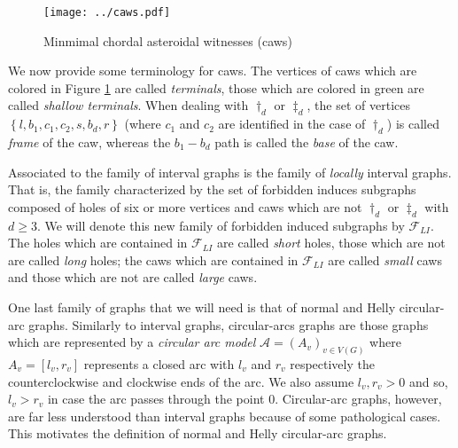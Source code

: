 \documentclass{article}
\theoremstyle{definition}
\begin{document}
    \begin{figure}[h]
        \centering
        \texttt{[image: ../caws.pdf]}
        \caption{Minmimal chordal asteroidal witnesses (caws)}
        \label{caws}
    \end{figure}


    We now provide some
    terminology for caws.
    The vertices of caws
    which are colored in
    Figure \ref{caws} are called
    \emph{terminals},
    those which are
    colored in green
    are called
    \emph{shallow terminals}.
    When dealing
    with $\dagger_{d}$ or
    $\ddagger_{d}$,
    the set of vertices
    $\left\{l, b_1, c_1, c_2, s, b_d, r\right\}$
    (where $c_1$ and $c_2$ are
    identified in the case of $\dagger_{d}$)
    is called \emph{frame} of the caw,
    whereas the $b_1 - b_{d}$
    path is called the \emph{base}
    of the caw.

    Associated to the family 
    of interval graphs is the
    family of \emph{locally} interval
    graphs. That is, the family
    characterized by the set of forbidden
    induces subgraphs
    composed of holes
    of six or more vertices
    and caws which are
    not $\dagger_{d}$ or
    $\ddagger_{d}$ with
    $d \geq 3$.
    We will denote
    this new family of
    forbidden induced
    subgraphs by
    $\mathcal{F}_{LI}$.
    The holes which
    are contained
    in $\mathcal{F}_{LI}$ 
    are called \emph{short}
    holes, those which
    are not are called
    \emph{long} holes;
    the caws which
    are contained
    in $\mathcal{F}_{LI}$ 
    are called \emph{small} 
    caws and those
    which are not
    are called \emph{large}
    caws.

    One last family 
    of graphs that we
    will need is that
    of normal and Helly 
    circular-arc graphs.
    Similarly to interval
    graphs, circular-arcs
    graphs are those
    graphs which
    are represented
    by a \emph{circular arc 
    model} $\mathcal{A} = \left(A_{v}\right)_{v \in V\left(G\right)}$
    where $A_{v} = \left[l_{v}, r_{v}\right]$
    represents a closed arc
    with $l_{v}$ and $r_{v}$ respectively
    the counterclockwise and clockwise
    ends of the arc. We also
    assume $l_{v}, r_{v} > 0$ and
    so, $l_{v} > r_{v}$ in case
    the arc passes through the point $0$.
    Circular-arc graphs, however, 
    are far less understood than 
    interval graphs because of
    some pathological cases.
    This motivates the definition of
    normal and Helly circular-arc
    graphs.
\end{document}
